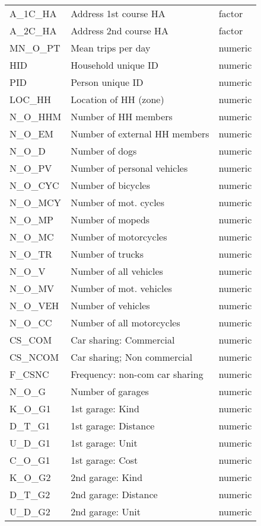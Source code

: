 \begin{longtable}{lll}
  A\_1C\_HA & Address 1st course HA & factor \\ 
  A\_2C\_HA & Address 2nd course HA & factor \\ 
  MN\_O\_PT & Mean trips per day & numeric \\ 
  HID & Household unique ID & numeric \\ 
  PID & Person unique ID & numeric \\ 
  LOC\_HH & Location of HH (zone) & numeric \\ 
  N\_O\_HHM & Number of HH members & numeric \\ 
  N\_O\_EM & Number of external HH members & numeric \\ 
  N\_O\_D & Number of dogs & numeric \\ 
  N\_O\_PV & Number of personal vehicles & numeric \\ 
  N\_O\_CYC & Number of bicycles & numeric \\ 
  N\_O\_MCY & Number of mot. cycles & numeric \\ 
  N\_O\_MP & Number of mopeds & numeric \\ 
  N\_O\_MC & Number of motorcycles & numeric \\ 
  N\_O\_TR & Number of trucks & numeric \\ 
  N\_O\_V & Number of all vehicles & numeric \\ 
  N\_O\_MV & Number of mot. vehicles & numeric \\ 
  N\_O\_VEH & Number of vehicles & numeric \\ 
  N\_O\_CC & Number of all motorcycles & numeric \\ 
  CS\_COM & Car sharing: Commercial & numeric \\ 
  CS\_NCOM & Car sharing; Non commercial & numeric \\ 
  F\_CSNC & Frequency: non-com car sharing & numeric \\ 
  N\_O\_G & Number of garages & numeric \\ 
  K\_O\_G1 & 1st garage: Kind & numeric \\ 
  D\_T\_G1 & 1st garage: Distance & numeric \\ 
  U\_D\_G1 & 1st garage: Unit & numeric \\ 
  C\_O\_G1 & 1st garage: Cost & numeric \\ 
  K\_O\_G2 & 2nd garage: Kind & numeric \\ 
  D\_T\_G2 & 2nd garage: Distance & numeric \\ 
  U\_D\_G2 & 2nd garage: Unit & numeric \\ 

\end{longtable}
